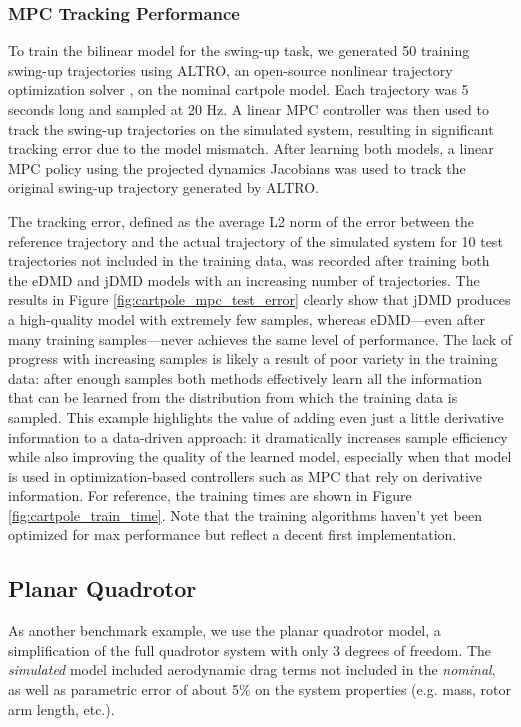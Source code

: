 \documentclass{article}
\begin{document}
\subsubsection{MPC Tracking Performance}

To train the bilinear model for the swing-up task, we generated 50 training swing-up
trajectories using ALTRO, an open-source nonlinear trajectory optimization solver 
\cite{Howell2019,Jackson2021}, on the nominal cartpole model. Each trajectory was 5 seconds
long and sampled at 20 Hz.  A linear MPC controller was then used to track the swing-up
trajectories on the simulated system, resulting in significant tracking error due to the
model mismatch.  After learning both models, a linear MPC policy using the projected 
dynamics Jacobians was used to track the original swing-up trajectory generated by ALTRO. 

The tracking error, defined as the average L2 norm of the error between the reference 
trajectory and the actual trajectory of the simulated system for 10 test trajectories not 
included in the training data, was recorded after training both the eDMD and jDMD models
with an increasing number of trajectories. The results in Figure
\ref{fig:cartpole_mpc_test_error} clearly show that jDMD produces a high-quality model with
extremely few samples, whereas eDMD---even after many training samples---never achieves the 
same level of performance. The lack of progress with increasing samples is likely a result 
of poor variety in the training data: after enough samples both methods effectively learn 
all the information that can be learned from the distribution from which the training data 
is sampled. This example highlights the value of adding even just a little derivative 
information to a data-driven approach: it dramatically increases sample efficiency while 
also improving the quality of the learned model, especially when that model is used in 
optimization-based controllers such as MPC that rely on derivative information. For 
reference, the training times are shown in Figure \ref{fig:cartpole_train_time}. Note that 
the training algorithms haven't yet been optimized for max performance but reflect a decent 
first implementation.


\subsection{Planar Quadrotor}
As another benchmark example, we use the planar quadrotor model, a simplification of the
full quadrotor system with only 3 degrees of freedom. The \textit{simulated} model included
aerodynamic drag terms not included in the \textit{nominal}, as well as parametric error of 
about 5\% on the system properties (e.g. mass, rotor arm length, etc.).
\end{document}
